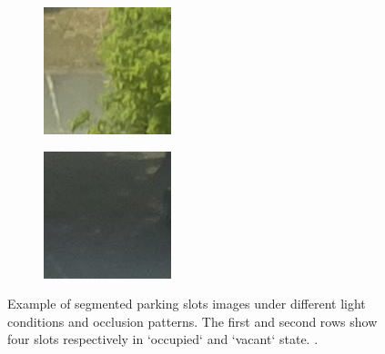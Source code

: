 \begin{figure}
\begin{subfigure}{0.25\columnwidth}
\end{subfigure}%
\begin{subfigure}{0.25\columnwidth}%
\includegraphics[width=\columnwidth]{11empty}%
\end{subfigure}%
\begin{subfigure}{0.25\columnwidth}%
\includegraphics[width=\columnwidth]{13empty}%
\end{subfigure}
\caption{Example of segmented parking slots images under different light conditions and occlusion patterns.
The first and second rows show four slots respectively in `occupied` and `vacant` state. .}
\label{fig:mini:slots}
\end{figure}

